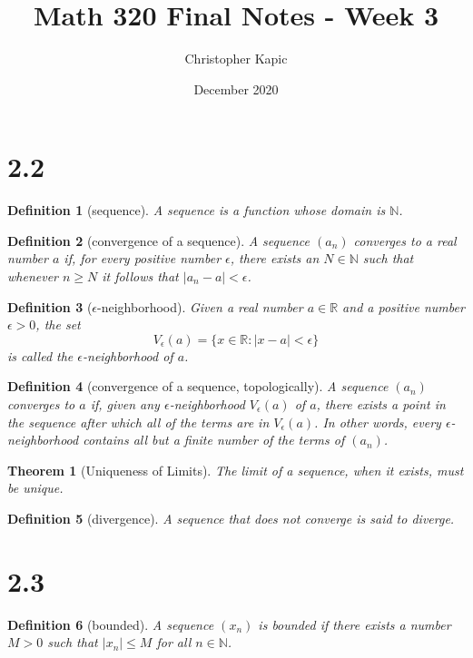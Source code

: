 \documentclass{article}
\title{Math 320 Final Notes - Week 3}
\author{Christopher Kapic}
\date{December 2020}
\newtheorem{definition}{Definition}
\newtheorem{theorem}{Theorem}
\begin{document}
\maketitle

\section*{2.2}
\begin{definition}[sequence]
    A \textit{sequence} is a function whose domain is $\mathbb{N}$.
\end{definition}

\begin{definition}[convergence of a sequence]
    A sequence $(a_n)$ \textit{converges} to a real number $a$ if, for every positive number $\epsilon$, there exists an $N \in \mathbb{N}$ such that whenever $n \geq N$ it follows that $|a_n - a| < \epsilon$.
\end{definition}

\begin{definition}[$\epsilon$-neighborhood]
    Given a real number $a \in \mathbb{R}$ and a positive number $\epsilon > 0$, the set \[V_\epsilon (a)=\{x \in \mathbb{R} : |x-a| < \epsilon\}\] is called the $\epsilon$-neighborhood of $a$.
\end{definition}

\begin{definition}[convergence of a sequence, topologically]
    A sequence $(a_n)$ converges to $a$ if, given any $\epsilon$-neighborhood $V_\epsilon (a)$ of $a$, there exists a point in the sequence after which all of the terms are in $V_\epsilon (a)$. In other words, every $\epsilon$-neighborhood contains all but a finite number of the terms of $(a_n)$.
\end{definition}

\begin{theorem}[Uniqueness of Limits]
    The limit of a sequence, when it exists, must be unique.
\end{theorem}

\begin{definition}[divergence]
    A sequence that does not converge is said to \textit{diverge}.
\end{definition}

\section*{2.3}
\begin{definition}[bounded]
    A sequence $(x_n)$ is \textit{bounded} if there exists a number $M > 0$ such that $|x_n|\leq M$ for all $n \in \mathbb{N}$.
\end{definition}
\end{document}
